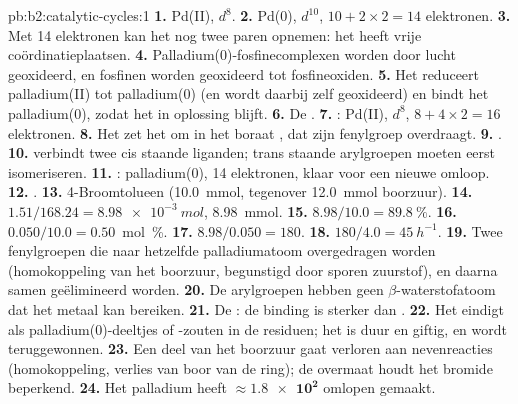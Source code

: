 \begin{solution}{pb:b2:catalytic-cycles:1}
\textbf{1.} Pd(II), $d^8$.
\textbf{2.} Pd(0), $d^{10}$, $10 + 2 \times 2 = 14$ elektronen.
\textbf{3.} Met 14 elektronen kan het nog twee paren opnemen: het heeft vrije coördinatieplaatsen.
\textbf{4.} Palladium(0)-fosfinecomplexen worden door lucht geoxideerd, en fosfinen worden
geoxideerd tot fosfineoxiden.
\textbf{5.} Het reduceert palladium(II) tot palladium(0) (en wordt daarbij zelf geoxideerd) en bindt het
palladium(0), zodat het in oplossing blijft.
\textbf{6.} De .
\textbf{7.} : Pd(II), $d^8$, $8 + 4 \times 2 =
16$ elektronen.
\textbf{8.} Het zet het om in het boraat , dat zijn fenylgroep overdraagt.
\textbf{9.} .
\textbf{10.}  verbindt twee cis staande liganden; trans staande arylgroepen moeten eerst isomeriseren.
\textbf{11.} : palladium(0), 14 elektronen, klaar
voor een nieuwe omloop.
\textbf{12.} .
\textbf{13.} 4-Broomtolueen (\qty{10.0}{mmol}, tegenover \qty{12.0}{mmol} boorzuur).
\textbf{14.} $1.51/168.24 = \qty{8.98e-3}{mol}$, \qty{8.98}{mmol}.
\textbf{15.} $8.98/10.0 = 89.8~\%$.
\textbf{16.} $0.050/10.0 = 0.50$~mol~\%.
\textbf{17.} $8.98/0.050 = 180$.
\textbf{18.} $180/4.0 = \qty{45}{h^{-1}}$.
\textbf{19.} Twee fenylgroepen die naar hetzelfde palladiumatoom overgedragen worden (homokoppeling van het
boorzuur, begunstigd door sporen zuurstof), en daarna samen geëlimineerd worden.
\textbf{20.} De arylgroepen hebben geen $\beta$-waterstofatoom dat het metaal kan bereiken.
\textbf{21.} De : de binding  is sterker dan .
\textbf{22.} Het eindigt als palladium(0)-deeltjes of -zouten in de residuen; het is duur en
giftig, en wordt teruggewonnen.
\textbf{23.} Een deel van het boorzuur gaat verloren aan nevenreacties (homokoppeling, verlies van boor
van de ring); de overmaat houdt het bromide beperkend.
\textbf{24.} Het palladium heeft $\boldsymbol{\approx \num{1.8e2}}$ omlopen gemaakt.
\end{solution}
